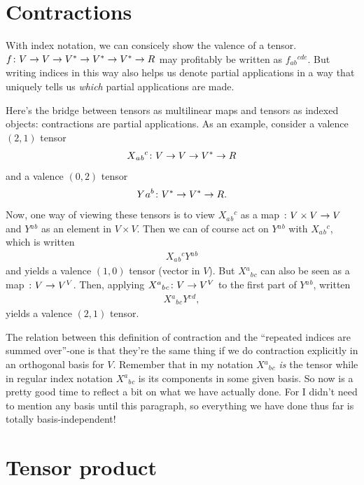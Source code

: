\documentclass[english, 12pt]{article}
\begin{document}
\section{Contractions}%
\label{sec:contractions}

With index notation, we can consicely show the valence of a tensor.
$f \colon V \to V \to {V}^{\ast} \to {V}^{\ast} \to {V}^{\ast} \to R$ may profitably be written as $f{}_{a b}{}^{c d e}$.
But writing indices in this way also helps us denote partial applications in a way that uniquely tells us \emph{which} partial applications are made.

Here's the bridge between tensors as multilinear maps and tensors as indexed objects: contractions are partial applications.
As an example, consider a valence $(2, 1)$ tensor
\begin{align*}
	X{}_a{}_b{}^c \colon V \to V \to {V}^{\ast} \to R
\end{align*}
and a valence $(0, 2)$ tensor
\begin{align*}
	Y{}^{}a{}^b \colon {V}^{\ast} \to {V}^{\ast} \to R.
\end{align*}
Now, one way of viewing these tensors is to view $X{}_a{}_b{}^c$ as a map $\colon V \times V \to V$ and $Y{}^a{}^b$ as an element in $V \times V$.
Then we can of course act on $Y{}^a{}^b$ with $X{}_a{}_b{}^c$,
which is written
\begin{align*}
	X{}_a{}_b{}^c Y{}^a{}^b
\end{align*}
and yields a valence $(1, 0)$ tensor (vector in $V$).
But $X{}^a{}_b{}_c$ can also be seen as a map $\colon V \to V^V$.
Then, applying $X{}^a{}_b{}_c\colon V \to V^V$ to the first part of $Y{}^a{}^b$, written
\begin{align*}
	X{}^a{}_b{}_c Y{}^c{}^d,
\end{align*}
yields a valence $(2, 1)$ tensor.

The relation between this definition of contraction and the \enquote{repeated indices are summed over}-one is that they're the same thing if we do contraction explicitly in an orthogonal basis for $V$.
Remember that in my notation $X{}^a{}_b{}_c$ \emph{is} the tensor while in regular index notation $X{}^a{}_b{}_c$ is its components in some given basis.
So now is a pretty good time to reflect a bit on what we have actually done.
For I didn't need to mention any basis until this paragraph, so everything we have done thus far is totally basis-independent!

\section{Tensor product}%
\label{sec:tensor_product}
\end{document}

